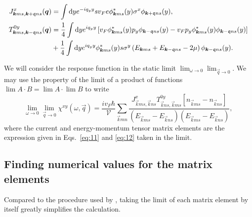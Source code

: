 \begin{align}\label{eq:11}
  J^x_{\bm{k}ms, \bm{k}+\mathfrak{q}ns}(\bm{q}) &= \int \mathrm{d}y
                                                e^{-i q_y y}
                                                s v_F e\phi ^{*}_{\bm{k}m s}(y) \sigma^x
                                                \phi _{\bm{k}+\mathfrak{q}n s}(y),\\
  T^{0y}_{\bm{k} m s, \bm{k}-\mathfrak{q} n s}(\bm{q}) &= \frac{1}{4} \label{eq:12}
                                                           \int \mathrm{d}y
                                                           e^{iq_y y}
                                                           \left[
                                                           v_F \phi ^{*}_{\bm{k}m s}(y) p_y
                                                           \phi _{\bm{k}-\mathfrak{q}n s}(y)
                                                           -
                                                           v_Fp_y \phi ^{*}_{\bm{k}m s}(y)
                                                           \phi _{\bm{k}-\mathfrak{q}n s}(y)
                                                           \right]\\
  \nonumber &+ \frac{1}{4} 
              \int \mathrm{d}y
              e^{iq_y y}
              \phi ^{*}_{\bm{k}m s}(y)
              s\sigma ^y
              \left(
              E_{\bm{k}m s} + E_{\bm{k}-\mathfrak{q} n s} - 2 \mu  
              \right)
              \phi _{\bm{k}-\mathfrak{q} n s}(y).
\end{align}

We will consider the response function in the static limit \( \lim_{\omega \to 0} \lim_{\vec{q} \to 0} \).
We may use the property of the limit of a product of functions \( \lim A\cdot B = \lim A \cdot \lim B \) to write
\begin{equation}
  \lim_{\omega \to 0} \lim_{\vec{q} \to 0} \chi^{xy}(\omega, \vec{q}) = \frac{i v_F \hbar}{\mathcal{V}} \sum\limits_{\vec{k} m n}^{}
  \frac{
    J^x_{\vec{k} m s, \vec{k} n s} T^{0y}_{\vec{k} n s, \vec{k} m s} [n_{\vec{k} m s} - n_{\vec{k} n s}]
  }{
    (E_{\vec{k} m s} - E_{\vec{k} n s}) (E_{\vec{k} m s}- E_{\vec{k} n s})
  },
\end{equation}
where the current and energy-momentum tensor matrix elements are the expression given in Eqs.~\eqref{eq:11} and \eqref{eq:12} taken in the limit.


\subsection{Finding numerical values for the matrix elements}
Compared to the procedure used by \autocite{arjonaFingerprintsConformalAnomaly2019}\cite{arjonaFingerprintsConformalAnomaly2019}, taking the limit of each matrix element by itself greatly simplifies the calculation.

